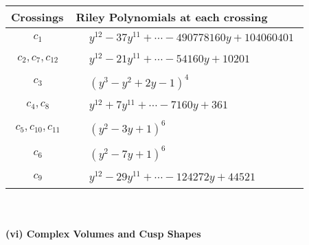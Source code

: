 \documentclass[1p]{elsarticle_modified}
\theoremstyle{definition}
\begin{document}
\begin{tabular}{m{50pt}|m{274pt}}
Crossings & \hspace{64pt}Riley Polynomials at each crossing \\
\hline $$\begin{aligned}c_{1}\end{aligned}$$&$\begin{aligned}
&y^{12}-37 y^{11}+\cdots-490778160 y+104060401
\end{aligned}$\\
\hline $$\begin{aligned}c_{2},c_{7},c_{12}\end{aligned}$$&$\begin{aligned}
&y^{12}-21 y^{11}+\cdots-54160 y+10201
\end{aligned}$\\
\hline $$\begin{aligned}c_{3}\end{aligned}$$&$\begin{aligned}
&(y^3- y^2+2 y-1)^4
\end{aligned}$\\
\hline $$\begin{aligned}c_{4},c_{8}\end{aligned}$$&$\begin{aligned}
&y^{12}+7 y^{11}+\cdots-7160 y+361
\end{aligned}$\\
\hline $$\begin{aligned}c_{5},c_{10},c_{11}\end{aligned}$$&$\begin{aligned}
&(y^2-3 y+1)^6
\end{aligned}$\\
\hline $$\begin{aligned}c_{6}\end{aligned}$$&$\begin{aligned}
&(y^2-7 y+1)^6
\end{aligned}$\\
\hline $$\begin{aligned}c_{9}\end{aligned}$$&$\begin{aligned}
&y^{12}-29 y^{11}+\cdots-124272 y+44521
\end{aligned}$\\
\hline
\end{tabular}\\~\\
\newpage\flushleft \textbf{(vi) Complex Volumes and Cusp Shapes}
\end{document}
